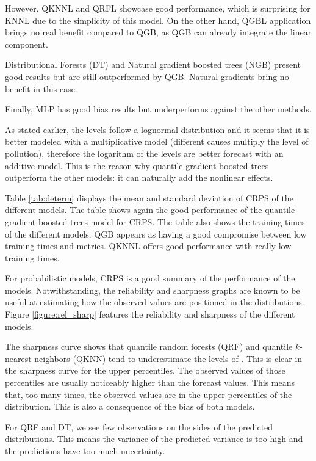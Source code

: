 \documentclass[a4paper,3p,sort&compress]{elsarticle}
\begin{document}
However, QKNNL and QRFL showcase good performance, 
which is surprising for KNNL 
due to the simplicity 
of this model.
On the other hand, QGBL application brings no real benefit compared 
to QGB, as QGB can already integrate the linear component.

Distributional Forests (DT) and Natural gradient boosted trees (NGB) 
present good results but are still outperformed by QGB. Natural gradients 
bring no benefit in this case. 

Finally, MLP has good bias results but underperforms against the other methods.

As stated earlier, the \no levels follow a lognormal
distribution and it seems that it is better modeled with a
multiplicative model (different causes multiply the level of
pollution), therefore the logarithm of the \no levels
are better forecast with an additive model. 
This is the reason why
quantile gradient boosted trees outperform 
the other models: it can naturally
add the nonlinear effects.

Table \ref{tab:determ} displays the mean and standard deviation of CRPS 
of the different models. The table shows again the good
performance of the quantile 
gradient boosted trees model for CRPS. The table also shows the training times 
of the different models. QGB appears as having a good compromise 
between low training times and metrics. QKNNL offers good performance with really low 
training times.

For probabilistic models, CRPS is a good summary of the performance of
the models. Notwithstanding, the reliability and sharpness graphs are
known to be useful at estimating how the observed values are
positioned in the distributions.  Figure \ref{figure:rel_sharp}
features the reliability and sharpness of the different models.

The sharpness curve shows that 
quantile random forests (QRF)
and quantile $k$-nearest
neighbors (QKNN) tend to underestimate the levels of
\no. This is clear in the sharpness curve for the
upper percentiles. The observed values of those percentiles are
usually noticeably higher than the forecast values. This means that,
too many times, the observed values are in the upper percentiles of
the distribution. This is also a consequence of the bias of both
models.

For QRF and DT, we see few 
observations on the sides of the predicted distributions. This means 
the variance of the predicted variance is too high and the predictions 
have too much uncertainty.
\end{document}
